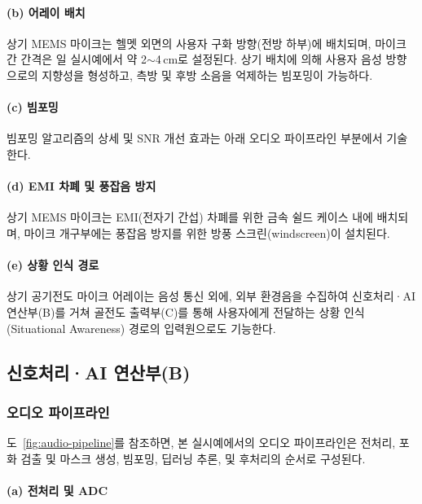 \documentclass{article}
\begin{document}
\paragraph{(b) 어레이 배치}

상기 MEMS 마이크는 헬멧 외면의 사용자 구화 방향(전방 하부)에 배치되며, 마이크 간 간격은 일 실시예에서 약 2$\sim$4\,cm로 설정된다. 상기 배치에 의해 사용자 음성 방향으로의 지향성을 형성하고, 측방 및 후방 소음을 억제하는 빔포밍이 가능하다.

\paragraph{(c) 빔포밍}

빔포밍 알고리즘의 상세 및 SNR 개선 효과는 아래 오디오 파이프라인 부분에서 기술한다.

\paragraph{(d) EMI 차폐 및 풍잡음 방지}

상기 MEMS 마이크는 EMI(전자기 간섭) 차폐를 위한 금속 쉴드 케이스 내에 배치되며, 마이크 개구부에는 풍잡음 방지를 위한 방풍 스크린(windscreen)이 설치된다.

\paragraph{(e) 상황 인식 경로}

상기 공기전도 마이크 어레이는 음성 통신 외에, 외부 환경음을 수집하여 신호처리·AI 연산부(B)를 거쳐 골전도 출력부(C)를 통해 사용자에게 전달하는 상황 인식(Situational Awareness) 경로의 입력원으로도 기능한다.

\subsection{신호처리·AI 연산부(B)}

\subsubsection{오디오 파이프라인}

도~\ref{fig:audio-pipeline}를 참조하면, 본 실시예에서의 오디오 파이프라인은 전처리, 포화 검출 및 마스크 생성, 빔포밍, 딥러닝 추론, 및 후처리의 순서로 구성된다.

\paragraph{(a) 전처리 및 ADC}
\end{document}
